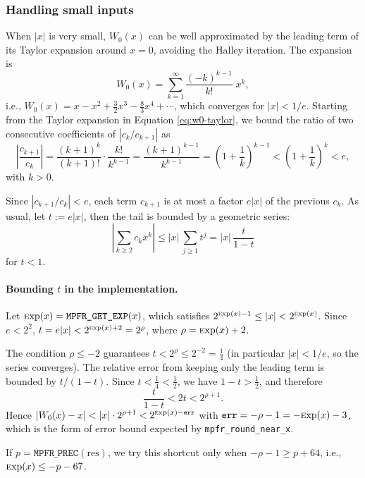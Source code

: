 \documentclass[12pt]{amsart}
\def\Exp{{\rm \textsc exp}}
\begin{document}
\subsubsection{Handling small inputs}

When $|x|$ is very small, $W_0(x)$ can be well approximated by the leading
term of its Taylor expansion around $x=0$, avoiding the Halley iteration.
The expansion is
\begin{equation} \label{eq:w0-taylor}
  W_0(x) = \sum_{k=1}^{\infty} \dfrac{(-k)^{k-1}}{k!}\;x^k,
\end{equation}
i.e., $W_0(x) = x - x^2 + \frac{3}{2}x^3 - \frac{8}{3}x^4 + \cdots$, which
converges for $|x| < 1/e$. Starting from the Taylor expansion in Equation
\ref{eq:w0-taylor}, we bound the ratio of two consecutive coefficients of
$|c_k/c_{k+1}|$ as
\[
  \left|\frac{c_{k+1}}{c_k}\right|
  = \frac{(k+1)^k}{(k+1)!} \cdot \frac{k!}{k^{k-1}}
  = \frac{(k+1)^{k-1}}{k^{k-1}}
  = \left(1 + \frac{1}{k}\right)^{k-1}
  < \left(1 + \frac{1}{k}\right)^{k}
  < e,
\]
with $k > 0$.

Since $|c_{k+1}/c_k| < e$, each term $c_{k+1}$ is at most a factor $e|x|$ of the
previous $c_k$. As usual, let $t := e|x|$, then the tail is bounded by a
geometric series:
\[
  \left|\sum_{k \ge 2} c_k x^k\right| \le |x|\,\sum_{j \ge 1} t^j
  = |x|\,\frac{t}{1-t}
\]
for $t < 1$.

\paragraph{\textbf{Bounding $t$ in the implementation.}}
Let $\Exp(x) = \texttt{MPFR\_GET\_EXP}(x)$, which satisfies $2^{\Exp(x)-1} \le
|x| < 2^{\Exp(x)}$. Since $e < 2^2$, $t = e|x| < 2^{\Exp(x) + 2} = 2^\rho$,
where $\rho = \Exp(x) + 2$.

The condition $\rho \le -2$ guarantees
$t < 2^\rho \le 2^{-2} = \tfrac{1}{4}$ (in particular $|x| < 1/e$, so the
series converges).
The relative error from keeping only the leading term is bounded by
$t/(1-t)$. Since $t < \tfrac{1}{4} < \tfrac{1}{2}$, we have
$1 - t > \tfrac{1}{2}$, and therefore
\[
  \frac{t}{1-t} < 2t < 2^{\rho+1}.
\]
Hence $|W_0(x) - x| < |x| \cdot 2^{\rho+1} < 2^{\Exp(x) - \mathtt{err}}$ with
$\mathtt{err} = -\rho - 1 = -\Exp(x) - 3$, which is the form of error bound
expected by \texttt{mpfr\_round\_near\_x}.

If $p = \texttt{MPFR\_PREC}(\mathrm{res})$, we try this shortcut only when
$-\rho - 1 \ge p + 64$, i.e., $\Exp(x) \le -p - 67$.
\end{document}

